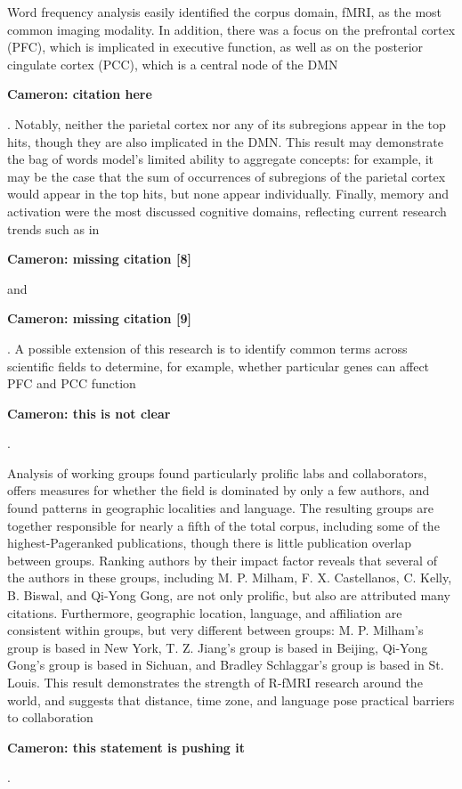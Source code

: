 \documentclass[12pt,5p]{elsarticle}
\newcommand\MyCBox[1]{%
  \colorbox{yellow!60}{\begin{varwidth}{\dimexpr\linewidth-2\fboxsep}#1\end{varwidth}}}
\newcommand{\COMMENTCC}[1]{\MyCBox{\textcolor{cc_commentcolor}{\textbf{Cameron:
#1}}}}
\begin{document}
Word frequency analysis easily identified the corpus domain, fMRI, as the
most common imaging modality. In addition, there was a focus on the
prefrontal cortex (PFC), which is implicated in executive function, as
well as on the posterior cingulate cortex (PCC), which is a central node
of the DMN \COMMENTCC{citation here}.  Notably, neither the parietal
cortex nor any of its subregions appear in the top hits, though they are
also implicated in the DMN. This result may demonstrate the bag of words
model’s limited ability to aggregate concepts: for example, it may be the
case that the sum of occurrences of subregions of the parietal cortex
would appear in the top hits, but none appear individually. Finally,
memory and activation were the most discussed cognitive domains,
reflecting current research trends such as in \COMMENTCC{missing citation
[8]} and \COMMENTCC{missing citation [9]}. A possible extension of this
research is to identify common terms across scientific fields to
determine, for example, whether particular genes can affect PFC and PCC
function \COMMENTCC{this is not clear}.

Analysis of working groups found particularly prolific labs and
collaborators, offers measures for whether the field is dominated by only
a few authors, and found patterns in geographic localities and language.
The resulting groups are together responsible for nearly a fifth of the
total corpus, including some of the highest-Pageranked publications,
though there is little publication overlap between groups. Ranking authors
by their impact factor reveals that several of the authors in these
groups, including M. P. Milham, F. X. Castellanos, C.  Kelly, B. Biswal,
and Qi-Yong Gong, are not only prolific, but also are attributed many
citations. Furthermore, geographic location, language, and affiliation are
consistent within groups, but very different between groups: M. P.
Milham’s group is based in New York, T. Z. Jiang’s group is based in
Beijing, Qi-Yong Gong’s group is based in Sichuan, and Bradley Schlaggar’s
group is based in St. Louis.  This result demonstrates the strength of
R-fMRI research around the world, and suggests that distance, time zone,
and language pose practical barriers to collaboration \COMMENTCC{this
statement is pushing it}.
\end{document}
